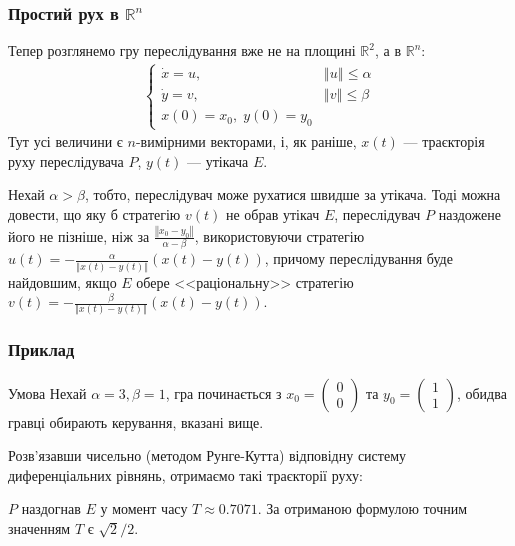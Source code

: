 \documentclass[10pt,pdf,aspectratio=169]{beamer}
\newcommand{\R}{\mathbb{R}}
\renewcommand{\d}[1]{\dot{#1}}
\newcommand{\norm}[1]{\left\Vert #1 \right\Vert}
\begin{document}
    \begin{frame}
        \frametitle{Простий рух в $\R^n$}
    
        Тепер розглянемо гру переслідування вже не на площині $\R^2$, а в $\R^n$:
        \begin{gather*}
            \begin{cases}
                \d{x} = u, & \norm{u} \leq \alpha \\
                \d{y} = v, & \norm{v} \leq \beta \\
                x(0) = x_0, \; y(0) = y_0
            \end{cases}
        \end{gather*}
        Тут усі величини є $n$-вимірними векторами, і, як раніше, $x(t)$ --- траєкторія
        руху переслідувача $P$, $y(t)$ --- утікача $E$.
    
        Нехай $\alpha > \beta$, тобто, переслідувач може рухатися швидше за утікача. 
        Тоді можна довести, що яку б стратегію $v(t)$ не обрав утікач $E$, переслідувач $P$ наздожене його не пізніше,
        ніж за $\frac{\norm{x_0 - y_0}}{\alpha - \beta}$, використовуючи стратегію $u(t) = - \frac{\alpha}{\norm{x(t) - y(t)}} (x(t) - y(t))$,
        причому переслідування буде найдовшим, якщо $E$ обере <<раціональну>> стратегію $v(t) = - \frac{\beta}{\norm{x(t) - y(t)}} (x(t) - y(t))$.

    \end{frame}
    \begin{frame}
        \frametitle{Приклад}
    
        \begin{block}{Умова}
            Нехай $\alpha = 3, \beta = 1$, гра починається з $x_0 = \begin{pmatrix}
                0 \\ 0
            \end{pmatrix}$ та $y_0 = \begin{pmatrix}
                1 \\ 1
            \end{pmatrix}$, обидва гравці обирають керування, вказані вище.
        \end{block}
        Розв'язавши чисельно (методом Рунге-Кутта) відповідну систему диференціальних рівнянь, отримаємо
        такі траєкторії руху:
        \begin{center}
            \resizebox{120pt}{!}{
                
            }
        \end{center}
        $P$ наздогнав $E$ у момент часу $T \approx 0.7071$. За отриманою формулою точним значенням $T$ є $\sqrt{2}/2$.
    \end{frame}
\end{document}
